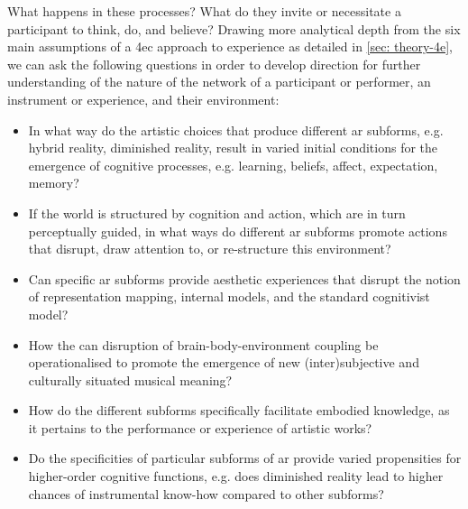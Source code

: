 What happens in these processes?  What do they invite or necessitate a participant to think, do, and believe? Drawing more analytical depth from the six main assumptions of a \gls{4ec} approach to experience as detailed in \autoref{sec: theory-4e}, we can ask the following questions in order to develop direction for further understanding of the nature of the network of a participant or performer, an instrument or experience, and their environment:
	\begin{itemize}
	    \item In what way do the artistic choices that produce different \gls{ar} subforms, e.g. hybrid reality, diminished reality, result in varied initial conditions for the emergence of cognitive processes, e.g. learning, beliefs, affect, expectation, memory?

	    \item If the world is structured by cognition and action, which are in turn perceptually guided, in what ways do different \gls{ar} subforms promote actions that disrupt, draw attention to, or re-structure this environment?

	    \item Can specific \gls{ar} subforms provide aesthetic experiences that disrupt the notion of representation mapping, internal models, and the standard cognitivist model?

	    \item How the can disruption of brain-body-environment coupling be operationalised to promote the emergence of new (inter)subjective and culturally situated musical meaning?

	    \item How do the different subforms specifically facilitate embodied knowledge, as it pertains to the performance or experience of artistic works?

	    \item Do the specificities of particular subforms of \gls{ar} provide varied propensities for higher-order cognitive functions, e.g. does diminished reality lead to higher chances of instrumental know-how compared to other subforms?
	\end{itemize}

